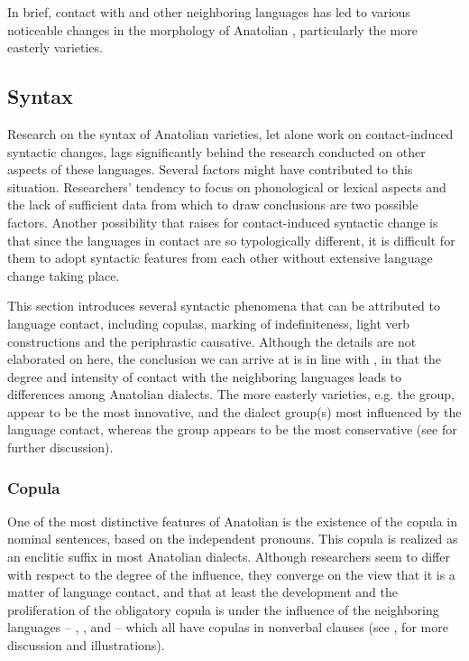 \documentclass[output=paper]{langsci/langscibook}
\begin{document}
In brief, contact with  and other neighboring languages has led to various noticeable changes in the morphology of Anatolian , particularly the more easterly varieties.

\subsection{Syntax}
Research on the syntax of Anatolian  varieties, let alone work on contact-induced syntactic changes, lags significantly behind the research conducted on other aspects of these languages. Several factors might have contributed to this situation. Researchers' tendency to focus on phonological or lexical aspects and the lack of sufficient data from which to draw conclusions  are two possible factors. Another possibility that \cite{Ingham2005} raises for contact-induced syntactic change is that since the languages in contact are so typologically different, it is difficult for them to adopt syntactic features from each other without extensive {language change} taking place.


This section introduces several syntactic phenomena that can be attributed to language contact, including copulas, marking of indefiniteness, {light verb} constructions and the {periphrastic causative}. Although the details are not elaborated on here, the conclusion we can arrive at is in line with \cite{Ingham2005}, in that the degree and intensity of contact with the neighboring languages leads to differences among Anatolian  dialects. The more easterly varieties, e.g. the  group, appear to be the most innovative, and the dialect group(s) most influenced by the language contact, whereas the  group appears to be the most conservative (see \citealt{Akkus2017,Jastrow2011anatolian} for further discussion).

\subsubsection{Copula}

One of the most distinctive features of Anatolian  is the existence of the {copula} in nominal sentences, based on the independent pronouns. This {copula} is realized as an enclitic suffix in most Anatolian dialects. Although researchers seem to differ with respect to the degree of the influence, they converge on the view that it is a matter of language contact, and that at least the development and the proliferation of the obligatory {copula} is under the influence of the neighboring languages -- , ,  and  -- which all have copulas in nonverbal clauses (see \citealt{Lahdo2009,Grigore2007article,Palva2011,Talay2007,Jastrow2011anatolian,Akkus2016,Akkus2017,AkkusBenmamoun2018}, for more discussion and illustrations).
\end{document}
